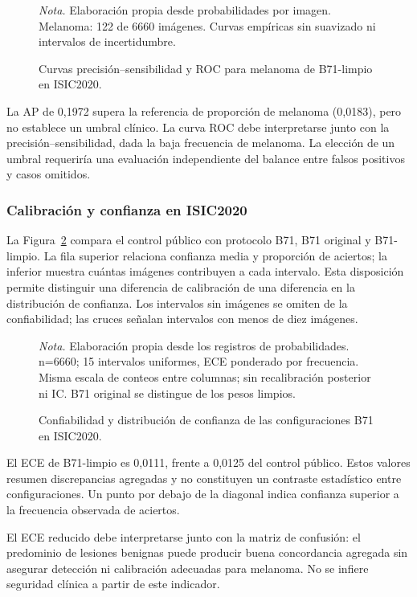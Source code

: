 \begin{figure}[!htbp]
\caption{Curvas precisión--sensibilidad y ROC para melanoma de B71-limpio en ISIC2020.}\label{fig:curvas-isic2020}
\centering

\par\smallskip
{\singlespacing\fontsize{11}{13}\selectfont\raggedright
\noindent\textit{Nota.} Elaboración propia desde probabilidades por imagen. Melanoma: 122 de 6660 imágenes. Curvas empíricas sin suavizado ni intervalos de incertidumbre.\par}
\end{figure}
\FloatBarrier
La AP de 0,1972 supera la referencia de proporción de melanoma (0,0183), pero no establece un umbral clínico. La curva ROC debe interpretarse junto con la precisión--sensibilidad, dada la baja frecuencia de melanoma. La elección de un umbral requeriría una evaluación independiente del balance entre falsos positivos y casos omitidos.

\subsubsection{Calibración y confianza en ISIC2020}
La Figura~\ref{fig:calibracion-isic2020} compara el control público con protocolo B71, B71 original y B71-limpio. La fila superior relaciona confianza media y proporción de aciertos; la inferior muestra cuántas imágenes contribuyen a cada intervalo. Esta disposición permite distinguir una diferencia de calibración de una diferencia en la distribución de confianza. Los intervalos sin imágenes se omiten de la confiabilidad; las cruces señalan intervalos con menos de diez imágenes.

\begin{figure}[!htbp]
\caption{Confiabilidad y distribución de confianza de las configuraciones B71 en ISIC2020.}\label{fig:calibracion-isic2020}
\centering

\par\smallskip
{\singlespacing\fontsize{11}{13}\selectfont\raggedright
\noindent\textit{Nota.} Elaboración propia desde los registros de probabilidades. n=6660; 15 intervalos uniformes, ECE ponderado por frecuencia. Misma escala de conteos entre columnas; sin recalibración posterior ni IC. B71 original se distingue de los pesos limpios.\par}
\end{figure}
\FloatBarrier
El ECE de B71-limpio es 0,0111, frente a 0,0125 del control público. Estos valores resumen discrepancias agregadas y no constituyen un contraste estadístico entre configuraciones. Un punto por debajo de la diagonal indica confianza superior a la frecuencia observada de aciertos.

El ECE reducido debe interpretarse junto con la matriz de confusión: el predominio de lesiones benignas puede producir buena concordancia agregada sin asegurar detección ni calibración adecuadas para melanoma. No se infiere seguridad clínica a partir de este indicador.
